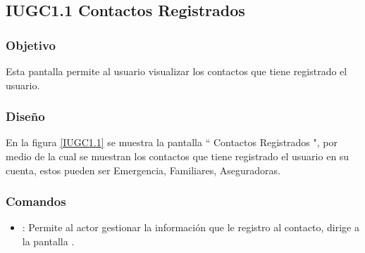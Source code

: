 \subsection{IUGC1.1 Contactos Registrados}

\subsubsection{Objetivo}

	
    Esta pantalla permite al usuario visualizar los contactos que tiene registrado el usuario.

\subsubsection{Diseño}


    En la figura \ref{IUGC1.1} se muestra la pantalla `` Contactos Registrados ", por medio de la cual se muestran los contactos que tiene registrado el usuario en su cuenta, estos pueden ser Emergencia, Familiares, Aseguradoras.\\


\subsubsection{Comandos}
    \begin{itemize}
    	\item \btnGestionar[Editar]: Permite al actor gestionar la información que le registro al contacto, dirige a la pantalla .
    \end{itemize}

